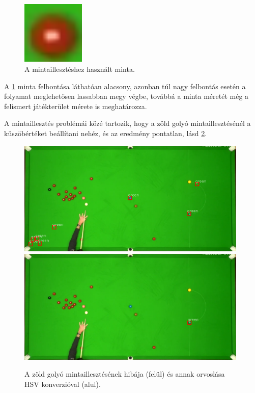 \begin{figure}[!ht]
    \centering
    \includegraphics[width=30mm, keepaspectratio]{figures/template_red.png}
    \caption{A mintaillesztéshez használt minta.}
    \label{fig:minta_kep}
\end{figure}

\par A \ref{fig:minta_kep} minta felbontása láthatóan alacsony, azonban túl nagy felbontás esetén a folyamat meglehetősen lassabban megy végbe, továbbá a minta méretét még a felismert játékterület mérete is meghatározza.
\par A mintaillesztés problémái közé tartozik, hogy a zöld golyó mintaillesztésénél a küszöbértéket beállítani nehéz, és az eredmény pontatlan, lásd \ref{fig:rossz_zold}.

\begin{figure}[!ht]
    \centering
    \includegraphics[width=110mm, keepaspectratio]{figures/wrong_green.png}\hspace{2mm}
	\includegraphics[width=110mm, keepaspectratio]{figures/green_ok.png}
    \caption{A zöld golyó mintaillesztésének hibája (felül) és annak orvoslása HSV konverzióval (alul).}
    \label{fig:rossz_zold}
\end{figure}

